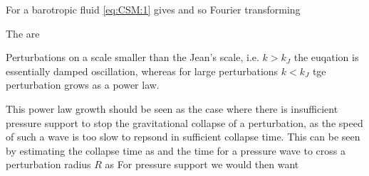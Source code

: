 \documentclass{article}
\begin{document}
For a barotropic fluid \ref{eq:CSM:1} gives 
and so Fourier transforming 

\begin{definition}
The  are
\end{definition}

Perturbations on a scale smaller than the Jean's scale, i.e. $k>k_J$ the euqation is essentially damped oscillation, whereas for large perturbations $k<k_J$ tge perturbation grows as a power law. 

\begin{idea}
This power law growth should be seen as the case where there is insufficient pressure support to stop the gravitational collapse of a perturbation, as the speed of such a wave is too slow to repsond in sufficient collapse time. This can be seen by estimating the collapse time as 
and the time for a pressure wave to cross a perturbation radius $R$ as 
For pressure support we would then want 
\end{idea}
\end{document}
